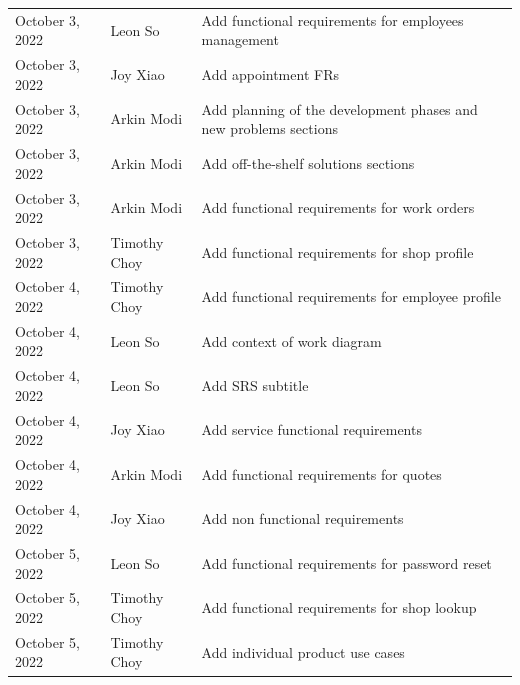 \documentclass[12pt]{article}
\begin{document}
\begin{table}[hp]
\begin{tabularx}{\textwidth}{llX}
		October 3, 2022    & Leon So               & Add functional requirements for employees management                               \\
		October 3, 2022    & Joy Xiao              & Add appointment FRs                                                                \\
		October 3, 2022    & Arkin Modi            & Add planning of the development phases and new problems sections                   \\
		October 3, 2022    & Arkin Modi            & Add off-the-shelf solutions sections                                               \\
		October 3, 2022    & Arkin Modi            & Add functional requirements for work orders                                        \\
		October 3, 2022    & Timothy Choy          & Add functional requirements for shop profile                                       \\
		October 4, 2022    & Timothy Choy          & Add functional requirements for employee profile                                   \\
		October 4, 2022    & Leon So               & Add context of work diagram                                                        \\
		October 4, 2022    & Leon So               & Add SRS subtitle                                                                   \\
		October 4, 2022    & Joy Xiao              & Add service functional requirements                                                \\
		October 4, 2022    & Arkin Modi            & Add functional requirements for quotes                                             \\
		October 4, 2022    & Joy Xiao              & Add non functional requirements                                                    \\
		October 5, 2022    & Leon So               & Add functional requirements for password reset                                     \\
		October 5, 2022    & Timothy Choy          & Add functional requirements for shop lookup                                        \\
		October 5, 2022    & Timothy Choy          & Add individual product use cases                                                   \\

		\bottomrule
	\end{tabularx}
\end{table}
\end{document}

